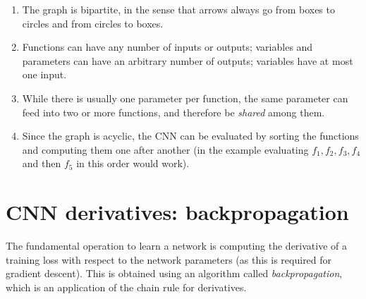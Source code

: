 \begin{enumerate}
\item The graph is bipartite, in the sense that arrows always go from boxes to circles and from circles to boxes. 
\item Functions can have any number of inputs or outputs; variables and parameters can have an arbitrary number of outputs; variables have at most one input.
\item While there is usually one parameter per function, the same parameter can feed into two or more functions, and therefore be \emph{shared} among them.
\item Since the graph is acyclic, the CNN can be evaluated by sorting the functions and computing them one after another (in the example evaluating $f_1,f_2,f_3,f_4$ and then $f_5$ in this order would work).
\end{enumerate}

\section{CNN derivatives: backpropagation}\label{s:back}

The fundamental operation to learn a network is computing the derivative of a training loss with respect to the network parameters (as this is required for gradient descent). This is obtained using an algorithm called \emph{backpropagation}, which is an application of the chain rule for derivatives.


